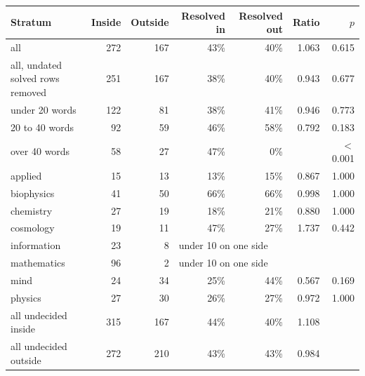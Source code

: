 \begin{tabular}{@{}lrrrrrr@{}}
\toprule
Stratum & Inside & Outside & Resolved in & Resolved out & Ratio & $p$ \\
\midrule
all & 272 & 167 & 43\% & 40\% & 1.063 & 0.615 \\
all, undated solved rows removed & 251 & 167 & 38\% & 40\% & 0.943 & 0.677 \\
under 20 words & 122 & 81 & 38\% & 41\% & 0.946 & 0.773 \\
20 to 40 words & 92 & 59 & 46\% & 58\% & 0.792 & 0.183 \\
over 40 words & 58 & 27 & 47\% & 0\% &  & $<$0.001 \\
applied & 15 & 13 & 13\% & 15\% & 0.867 & 1.000 \\
biophysics & 41 & 50 & 66\% & 66\% & 0.998 & 1.000 \\
chemistry & 27 & 19 & 18\% & 21\% & 0.880 & 1.000 \\
cosmology & 19 & 11 & 47\% & 27\% & 1.737 & 0.442 \\
information & 23 & 8 & \multicolumn{4}{l}{under 10 on one side} \\
mathematics & 96 & 2 & \multicolumn{4}{l}{under 10 on one side} \\
mind & 24 & 34 & 25\% & 44\% & 0.567 & 0.169 \\
physics & 27 & 30 & 26\% & 27\% & 0.972 & 1.000 \\
\midrule
all undecided inside & 315 & 167 & 44\% & 40\% & 1.108 & \\
all undecided outside & 272 & 210 & 43\% & 43\% & 0.984 & \\
\bottomrule
\end{tabular}
